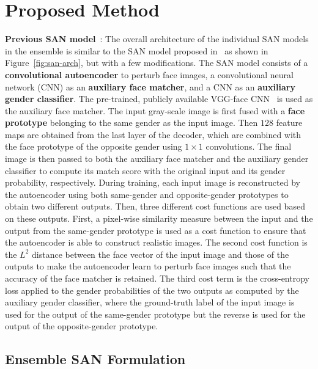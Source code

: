 \documentclass[10pt,twocolumn,letterpaper]{article}
\begin{document}
\section{Proposed Method}{\bf Previous SAN model}~\cite{mirjalili_semi_2018}:  The overall architecture of the individual SAN models  in the ensemble is similar to the SAN model proposed in~\cite{mirjalili_semi_2018} as shown in Figure~\ref{fig:san-arch}, but with a few modifications. The SAN model consists of a {\bf convolutional autoencoder} to perturb face images, a convolutional neural network (CNN) as an {\bf auxiliary face matcher}, and a CNN as an {\bf auxiliary gender classifier}. The pre-trained, publicly available VGG-face CNN~\cite{parkhi_deep_2015} is used as the auxiliary face matcher. The input gray-scale image is first fused with a {\bf face prototype} belonging to the same gender as the input image. Then $128$ feature maps are obtained from the last layer of the decoder, which are combined with the face prototype of the opposite gender using $1\times 1$ convolutions. The final image is then passed to both the auxiliary face matcher and the auxiliary gender classifier to compute its match score with the original input and its gender probability, respectively. During training, each input image is reconstructed by the autoencoder using both same-gender and opposite-gender prototypes to obtain two different outputs. Then, three different cost functions are used based on these outputs. First, a pixel-wise similarity measure between the input and the output from the same-gender prototype is used as a cost function to ensure that the autoencoder is able to construct realistic images. The second cost function is the $L^2$ distance between the face vector of the input image and those of the outputs to make the autoencoder learn to perturb face images such that the accuracy of the face matcher is  retained. The third cost term is the cross-entropy loss applied to the gender probabilities of the two outputs as computed by the auxiliary gender classifier, where the ground-truth label of the input image is used for the output of the same-gender prototype but the reverse is used for the output of the opposite-gender prototype.
\label{sec:ensemble-san-formulation}
\subsection{Ensemble SAN Formulation}
\end{document}
